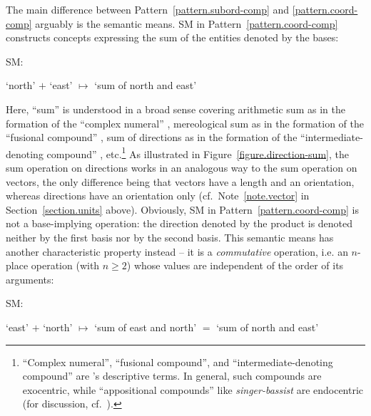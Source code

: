 \documentclass[output=paper
  ,nobabel
  ,draftmode
  ,colorlinks, citecolor=brown
]{langscibook}
\begin{document}
The main difference between Pattern \ref{pattern.subord-comp} and \ref{pattern.coord-comp} arguably is the semantic means. SM in Pattern \ref{pattern.coord-comp} constructs concepts expressing the
sum of the entities denoted by the bases: \begin{exe}
\ex \raggedright
\begin{labeledlist}{SM:}
\item[SM:] \raggedright ‘north’ $+$ ‘east’ $↦$ ‘sum of north and east’
\end{labeledlist}
\end{exe} 
Here, ``sum'' is understood in a broad
sense covering arithmetic sum as in the formation of the ``complex
numeral'' \emph{},
mereological sum as in the formation of the ``fusional
compound'' \emph{}, sum of directions as in the
formation of the ``intermediate-denoting compound'' \emph{}, etc.\footnote{\hspace{1pt}``Complex numeral'', ``fusional
compound'', and ``intermediate-denoting
compound'' are \citeauthor{waelchli:2005:co-compounds:natural}’s \citeyearpar{waelchli:2005:co-compounds:natural} descriptive terms. In general,
such compounds are exocentric, while ``appositional compounds''
like  \emph{singer-bassist} are endocentric
(for discussion, cf.\ \citealt{olsen:2014:coordinative:structures}).} As illustrated in
Figure \ref{figure.direction-sum}, the sum operation on
directions works in an analogous way to the sum operation on vectors, the only
difference being that vectors have a length and an orientation, whereas
directions have an orientation only (cf.\ Note \ref{note.vector} in Section \ref{section.units}
above). Obviously, SM in Pattern \ref{pattern.coord-comp} is not a base-implying operation: the direction
denoted by the product is denoted neither by the first basis nor by the second
basis. This semantic means has another characteristic property instead – it is a
\emph{commutative} operation, i.e. an $n$-place operation (with $n≥2$) whose values are independent of the order of its arguments: \begin{exe}
\ex \raggedright
\begin{labeledlist}{SM:}
\item[SM:] \raggedright ‘east’ $+$ ‘north’ $↦$
‘sum of east and north’ $=$ ‘sum of north and east’
\end{labeledlist}
\end{exe}
\end{document}
